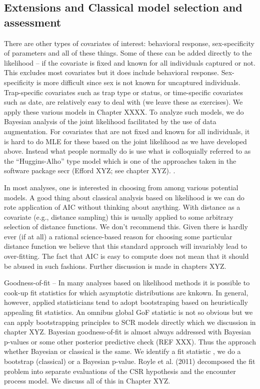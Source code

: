 \subsection{ Extensions and Classical model selection and assessment}

There are other types of covariates of interest: behavioral response,
sex-specificity of parameters and all of these things. Some of these
can be added directly to the likelihood – if the covariate is fixed
and known for all individuals captured or not. This excludes most
covariates but it does include behavioral response. Sex-specificity is
more difficult since sex is not known for uncaptured
individuals. Trap-specific covariates such as trap type or status, or
time-specific covariates such as date, are relatively easy to deal
with (we leave these as exercises).  We apply these various models in
Chapter XXXX. To analyze such models, we do Bayesian analysis of the
joint likelihood facilitated by the use of data augmentation. For
covariates that are not fixed and known for all individuals, it is
hard to do MLE for these based on the joint likelihood as we have
developed above. Instead what people normally do is use what is
colloquially referred to as the “Huggins-Alho” type model which is one
of the approaches taken in the software package secr (Efford XYZ; see
chapter XYZ). .

In most analyses, one is interested in choosing from among various
potential models. A good thing about classical analysis based on
likelihood is we can do rote application of AIC without thinking about
anything. With distance as a covariate (e.g., distance sampling) this
is usually applied to some arbitrary selection of distance
functions. We don’t recommend this. Given there is hardly ever (if at
all) a rational science-based reason for choosing some particular
distance function we believe that this standard approach will
invariably lead to over-fitting. The fact that AIC is easy to compute
does not mean that it should be abused in such fashions. Further
discussion is made in chapters XYZ.

Goodness-of-fit – In many analyses based on likelihood methods it is
possible to cook-up fit statistics for which asymptotic distributions
are knkown. In general, however, applied statisticians tend to adopt
bootstraping based on heuristically appealing fit statistics. An
omnibus global GoF statistic is not so obvious but we can apply
bootstrapping principles to SCR models directly which we discussion in
chapter XYZ.  Bayesian goodness-of-fit is almost always addressed with
Bayesian p-values or some other posterior predictive check (REF
XXX). Thus the approach whether Bayesian or classical is the same. We
identify a fit statistic , we do a bootstrap (classical) or a Bayesian
p-value.  Royle et al. (2011) decomposed the fit problem into separate
evaluations of the CSR hypothesis and the encounter process model. We
discuss all of this in Chapter XYZ.


